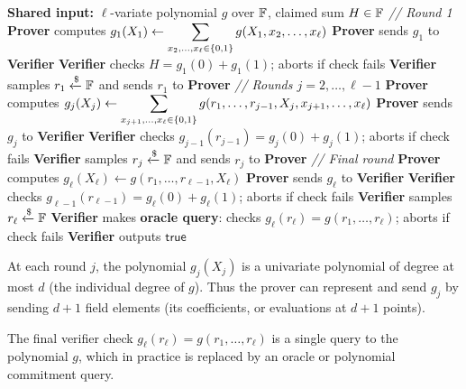 \documentclass[11pt]{article}
\begin{document}
\begin{algorithm}[H]
  \caption{Sumcheck Protocol}
  \begin{algorithmic}[1]
    \State \textbf{Shared input:} $\ell$-variate polynomial $g$ over $\mathbb{F}$, claimed sum $H \in \mathbb{F}$
    \Statex
    \textit{// Round 1}
    \State \textbf{Prover} computes $g_1(X_1) \gets \displaystyle\sum_{x_2,\ldots,x_\ell \in \{0,1\}} g(X_1, x_2, \ldots, x_\ell)$
    \State \textbf{Prover} sends $g_1$ to \textbf{Verifier}
    \State \textbf{Verifier} checks $H = g_1(0) + g_1(1)$; aborts if check fails
    \State \textbf{Verifier} samples $r_1 \xleftarrow{\$} \mathbb{F}$ and sends $r_1$ to \textbf{Prover}
    \Statex
    \textit{// Rounds $j = 2, \ldots, \ell - 1$}
      \State \textbf{Prover} computes $g_j(X_j) \gets \displaystyle\sum_{x_{j+1},\ldots,x_\ell \in \{0,1\}} g(r_1, \ldots, r_{j-1}, X_j, x_{j+1}, \ldots, x_\ell)$
      \State \textbf{Prover} sends $g_j$ to \textbf{Verifier}
      \State \textbf{Verifier} checks $g_{j-1}(r_{j-1}) = g_j(0) + g_j(1)$; aborts if check fails
      \State \textbf{Verifier} samples $r_j \xleftarrow{\$} \mathbb{F}$ and sends $r_j$ to \textbf{Prover}
    \EndFor
    \Statex
    \textit{// Final round}
    \State \textbf{Prover} computes $g_\ell(X_\ell) \gets g(r_1, \ldots, r_{\ell-1}, X_\ell)$
    \State \textbf{Prover} sends $g_\ell$ to \textbf{Verifier}
    \State \textbf{Verifier} checks $g_{\ell-1}(r_{\ell-1}) = g_\ell(0) + g_\ell(1)$; aborts if check fails
    \State \textbf{Verifier} samples $r_\ell \xleftarrow{\$} \mathbb{F}$
    \State \textbf{Verifier} makes \textbf{oracle query}: checks $g_\ell(r_\ell) = g(r_1, \ldots, r_\ell)$; aborts if check fails
    \State \textbf{Verifier} outputs $\mathsf{true}$
  \end{algorithmic}
\end{algorithm}

\medskip

\begin{remark}
  At each round $j$, the polynomial $g_j(X_j)$ is a univariate polynomial of degree at most $d$
  (the individual degree of $g$). Thus the prover can represent and send $g_j$ by sending $d+1$
  field elements (its coefficients, or evaluations at $d+1$ points).

  The final verifier check $g_\ell(r_\ell) = g(r_1, \ldots, r_\ell)$ is a single query to the
  polynomial $g$, which in practice is replaced by an oracle or polynomial commitment query.
\end{remark}
\end{document}
